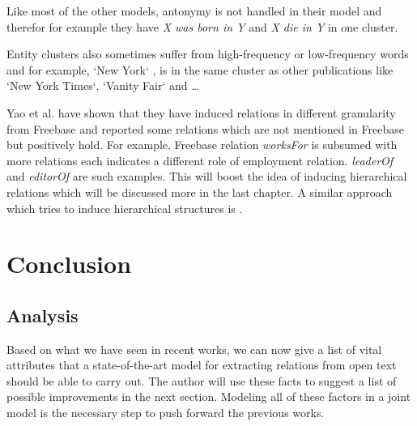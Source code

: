 \documentclass[12pt]{report}
\begin{document}
 Like most of the other models, antonymy is not handled in their model and therefor for example they have
 \emph{X was born in Y} and \emph{X die in Y} in one cluster.
 
 Entity clusters also sometimes suffer from high-frequency or low-frequency words and for example, `New York`
 , is in the same cluster as other publications like `New York Times`, `Vanity Fair` and \ldots
 
 Yao et al. have shown that they have induced relations in different granularity from Freebase and reported some relations
 which are not mentioned in Freebase but positively hold. For example, Freebase relation \emph{worksFor}
  is subsumed with more relations each indicates a different role of employment relation. \emph{leaderOf}
   and \emph{editorOf} are such examples. This will boost the idea of inducing hierarchical 
   relations which will be discussed more in the last chapter. A similar approach which tries to induce
    hierarchical structures is \cite{Alfonseca2012} .
 
 

\chapter{Conclusion}
\label{ch:conclusion}

\section{Analysis}
\label{ch:conclusion}

Based on what we have seen in recent works, we can now give a list of vital
attributes that a state-of-the-art model for extracting relations from open text
should be able to carry out. The author will use these facts to suggest a list of possible improvements
in the next section. Modeling all of
these factors in a joint model is the necessary step to push forward the previous
works.
\end{document}
